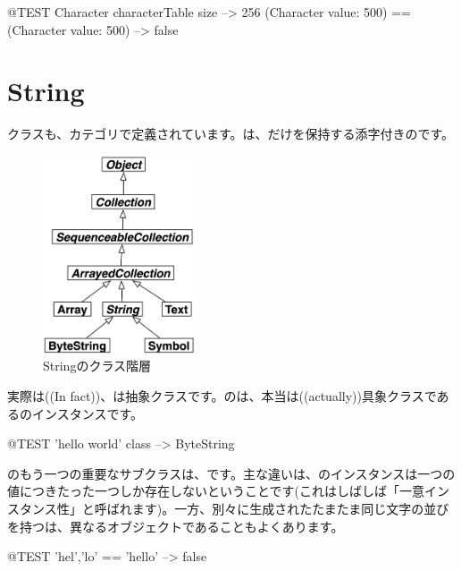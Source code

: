 \documentclass[a4paper,10pt,twoside]{book}
\begin{document}
\begin{code}{@TEST}
Character characterTable size                               --> 256
(Character value: 500) == (Character value: 500) --> false
\end{code}

\section{String}

クラスも、カテゴリで定義されています。は、だけを保持する添字付きのです。

\begin{figure}[ht]
  {\centerline {\includegraphics[width=0.4\textwidth]{StringHierarchy}}}
\caption{Stringのクラス階層 }
\end{figure}

実際は((In fact))、は抽象クラスです。\pharo のは、本当は((actually))具象クラスであるのインスタンスです。

\begin{code}{@TEST}
'hello world' class --> ByteString
\end{code}

のもう一つの重要なサブクラスは、です。主な違いは、のインスタンスは一つの値につきたった一つしか存在しないということです(これはしばしば「一意インスタンス性」と呼ばれます)。一方、別々に生成されたたまたま同じ文字の並びを持つは、異なるオブジェクトであることもよくあります。

\begin{code}{@TEST}
'hel','lo' == 'hello' --> false
\end{code}
\end{document}
